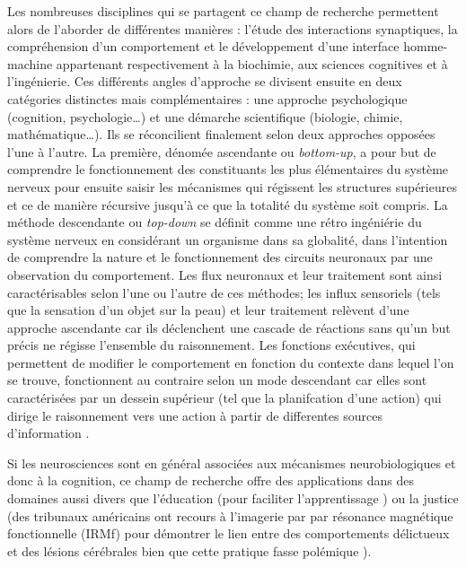 \documentclass[12pt,fleqn,oneside,openany]{book} %
\begin{document}
Les nombreuses disciplines qui se partagent ce champ de recherche permettent alors de l'aborder de différentes manières : l'étude des interactions synaptiques, la compréhension d'un comportement et le développement d'une interface homme-machine appartenant respectivement à la biochimie, aux sciences cognitives et à l'ingénierie. Ces différents angles d'approche se divisent ensuite en deux catégories distinctes mais complémentaires : une approche psychologique (cognition, psychologie…) et une démarche scientifique (biologie, chimie, mathématique…). Ils se réconcilient finalement selon deux approches opposées l'une à l'autre. La première, dénomée ascendante ou \emph{bottom-up}, a pour but de comprendre le fonctionnement des constituants les plus élémentaires du système nerveux pour ensuite saisir les mécanismes qui régissent les structures supérieures et ce de manière récursive jusqu'à ce que la totalité du système soit compris. La méthode descendante ou \emph{top-down} se définit comme une rétro ingéniérie du système nerveux en considérant un organisme dans sa globalité, dans l'intention de comprendre la nature et le fonctionnement des circuits neuronaux par une observation du comportement. Les flux neuronaux et leur traitement sont ainsi caractérisables selon l'une ou l'autre de ces méthodes; les influx sensoriels (tels que la sensation d'un objet sur la peau) et leur traitement relèvent d'une approche ascendante car ils déclenchent une cascade de réactions sans qu'un but précis ne régisse l'ensemble du raisonnement. Les fonctions exécutives, qui permettent de modifier le comportement en fonction du contexte dans lequel l'on se trouve, fonctionnent au contraire selon un mode descendant car elles sont caractérisées par un dessein supérieur (tel que la planifcation d'une action) qui dirige le raisonnement vers une action à partir de differentes sources d'information \cite{bottomupTopdown,foncExec}. 

Si les neurosciences sont en général associées aux mécanismes neurobiologiques et donc à la cognition, ce champ de recherche offre des applications dans des domaines aussi divers que l'éducation (pour faciliter l'apprentissage \cite{pedagogie}) ou la justice (des tribunaux américains ont recours à l'imagerie par par résonance magnétique fonctionnelle (IRMf) pour démontrer le lien entre des comportements délictueux et des lésions cérébrales bien que cette pratique fasse polémique \cite{justice}).
\end{document}
